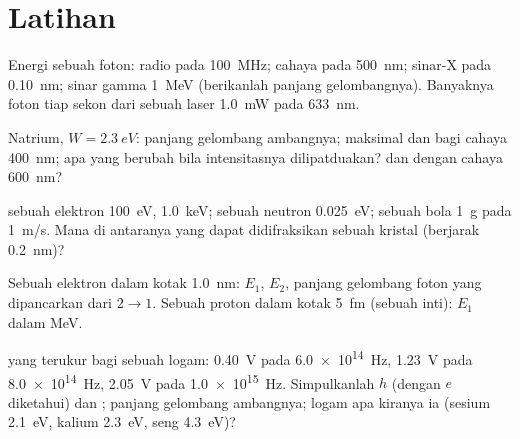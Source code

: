 \section{Latihan}

\begin{exercise}[$\star$]\label{exo:b1:quantum-introduction:1}
Energi sebuah foton: radio pada \qty{100}{MHz}; cahaya pada \qty{500}{nm};
sinar-X pada \qty{0.10}{nm}; sinar gamma \qty{1}{MeV} (berikanlah panjang
gelombangnya). Banyaknya foton tiap sekon dari sebuah laser \qty{1.0}{mW} pada
\qty{633}{nm}.
\end{exercise}

\begin{exercise}[$\star$]\label{exo:b1:quantum-introduction:2}
Natrium, $W = \qty{2.3}{eV}$: panjang gelombang ambangnya;  maksimal
dan  bagi cahaya \qty{400}{nm}; apa yang berubah bila
intensitasnya dilipatduakan? dan dengan cahaya \qty{600}{nm}?
\end{exercise}

\begin{exercise}[$\star$]\label{exo:b1:quantum-introduction:3}
 sebuah elektron \qty{100}{eV}, \qty{1.0}{keV};
sebuah neutron \qty{0.025}{eV}; sebuah bola \qty{1}{g} pada \qty{1}{m/s}.
Mana di antaranya yang dapat didifraksikan sebuah kristal (berjarak \qty{0.2}{nm})?
\end{exercise}

\begin{exercise}[$\star$]\label{exo:b1:quantum-introduction:4}
Sebuah elektron dalam kotak \qty{1.0}{nm}: $E_1$, $E_2$, panjang gelombang
foton yang dipancarkan dari $2 \to 1$. Sebuah proton dalam kotak \qty{5}{fm}
(sebuah inti): $E_1$ dalam \unit{MeV}.
\end{exercise}

\begin{exercise}[$\star\star$]\label{exo:b1:quantum-introduction:5}
 yang terukur bagi sebuah logam: \qty{0.40}{V} pada
\qty{6.0e14}{Hz}, \qty{1.23}{V} pada \qty{8.0e14}{Hz}, \qty{2.05}{V} pada
\qty{1.0e15}{Hz}. Simpulkanlah $h$ (dengan $e$ diketahui) dan ;
panjang gelombang ambangnya; logam apa kiranya ia (sesium \qty{2.1}{eV},
kalium \qty{2.3}{eV}, seng \qty{4.3}{eV})?
\end{exercise}

